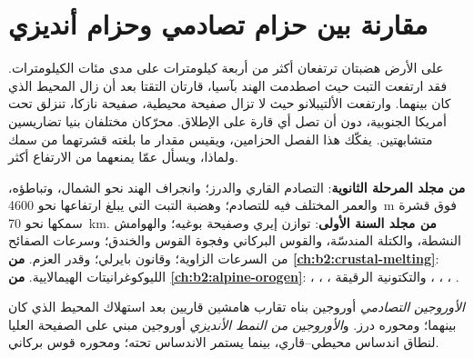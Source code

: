 \chapter{مقارنة بين حزام تصادمي وحزام أنديزي}\label{ch:b2:himalaya-andes}

على الأرض هضبتان ترتفعان أكثر من أربعة كيلومترات على مدى مئات الكيلومترات.
فقد ارتفعت التبت حيث اصطدمت الهند بآسيا، قارتان التقتا بعد أن زال المحيط الذي
كان بينهما. وارتفعت الألتيبلانو حيث لا تزال صفيحة محيطية، صفيحة نازكا، تنزلق
تحت أمريكا الجنوبية، دون أن تصل أي قارة على الإطلاق. محرّكان مختلفان بنيا
تضاريسين متشابهتين. يفكّك هذا الفصل الحزامين، ويقيس مقدار ما بلغته قشرتهما من سمك
ولماذا، ويسأل عمّا يمنعهما من الارتفاع أكثر.

\begin{recall}
\textbf{من مجلد المرحلة الثانوية}: التصادم القاري والدرز؛ وانجراف الهند
نحو الشمال، وتباطؤه، والعمر المختلف فيه للتصادم؛ وهضبة التبت التي يبلغ ارتفاعها نحو
\qty{4600}{m} فوق قشرة سمكها نحو \qty{70}{km}. \textbf{من مجلد السنة الأولى}:
توازن إيري وصفيحة بوغيه؛ والهوامش النشطة، والكتلة المندسّة، والقوس البركاني
وفجوة القوس والخندق؛ وسرعات الصفائح من السرعات الزاوية؛ وقانون بايرلي؛ وقدر
العزم. \textbf{من \cref{ch:b2:crustal-melting}}: الليوكوغرانيتات الهيمالايية.
\textbf{من \cref{ch:b2:alpine-orogen}}: ، ، ، والتكتونية الرقيقة
، ، ، .
\end{recall}

\begin{definition}\label{def:b2:himalaya-andes:types}
\emph{الأوروجين التصادمي} أوروجين بناه تقارب
هامشين قاريين بعد استهلاك المحيط الذي كان بينهما؛ ومحوره درز.
و\emph{الأوروجين من النمط الأنديزي} أوروجين مبني على الصفيحة
العليا لنطاق اندساس محيطي--قاري، بينما يستمر الاندساس تحته؛ ومحوره
قوس بركاني.
\end{definition}


